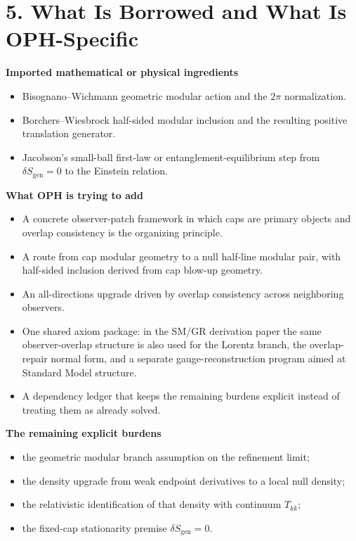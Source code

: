 \documentclass[10pt]{article}
\begin{document}
\section*{5. What Is Borrowed and What Is OPH-Specific}

\textbf{Imported mathematical or physical ingredients}
\begin{itemize}[leftmargin=1.8em]
\item Bisognano--Wichmann geometric modular action and the \(2\pi\) normalization.
\item Borchers--Wiesbrock half-sided modular inclusion and the resulting positive translation generator.
\item Jacobson's small-ball first-law or entanglement-equilibrium step from \(\delta S_{\mathrm{gen}}=0\) to the Einstein relation.
\end{itemize}

\textbf{What OPH is trying to add}
\begin{itemize}[leftmargin=1.8em]
\item A concrete observer-patch framework in which caps are primary objects and overlap consistency is the organizing principle.
\item A route from cap modular geometry to a null half-line modular pair, with half-sided inclusion derived from cap blow-up geometry.
\item An all-directions upgrade driven by overlap consistency across neighboring observers.
\item One shared axiom package: in the SM/GR derivation paper the same observer-overlap structure is also used for the Lorentz branch, the overlap-repair normal form, and a separate gauge-reconstruction program aimed at Standard Model structure.
\item A dependency ledger that keeps the remaining burdens explicit instead of treating them as already solved.
\end{itemize}

\textbf{The remaining explicit burdens}
\begin{itemize}[leftmargin=1.8em]
\item the geometric modular branch assumption on the refinement limit;
\item the density upgrade from weak endpoint derivatives to a local null density;
\item the relativistic identification of that density with continuum \(T_{kk}\);
\item the fixed-cap stationarity premise \(\delta S_{\mathrm{gen}}=0\).
\end{itemize}
\end{document}
